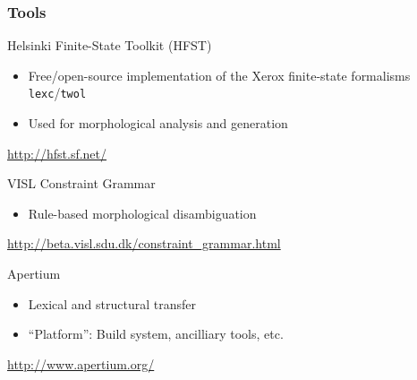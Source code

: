 \documentclass[10pt,xetex]{beamer} %
\begin{document}
\begin{frame}
  \frametitle{Tools}

  \begin{block}{Helsinki Finite-State Toolkit (HFST)}
    \begin{itemize}
      \item Free/open-source implementation of the Xerox 
         finite-state formalisms {\small {\tt lexc}}/{\small {\tt twol}}
      \item Used for morphological analysis and generation
    \end{itemize}
		\begin{center}
		{\small \url{http://hfst.sf.net/}}
		\end{center}
  \end{block}
  
  \begin{block}{VISL Constraint Grammar}
    \begin{itemize}
      \item Rule-based morphological disambiguation
    \end{itemize}
		\begin{center}
		{\small \url{http://beta.visl.sdu.dk/constraint\_grammar.html}}
		\end{center}

  \end{block}
  
  \begin{block}{Apertium}
    \begin{itemize}
      \item Lexical and structural transfer
      \item ``Platform'': Build system, ancilliary tools, etc.
    \end{itemize}
		\begin{center}
		{\small \url{http://www.apertium.org/} }
		\end{center}

  \end{block}
  
\end{frame}
\end{document}
